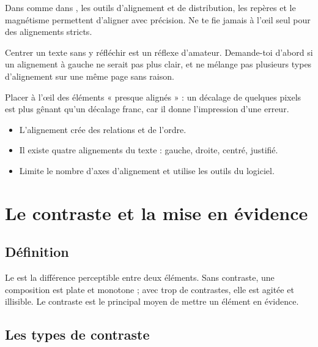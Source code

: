Dans  comme dans , les outils d'alignement et de distribution, les repères et le magnétisme permettent d'aligner avec précision. Ne te fie jamais à l'œil seul pour des alignements stricts.

\begin{astuce}
Centrer un texte sans y réfléchir est un réflexe d'amateur. Demande-toi d'abord si un alignement à gauche ne serait pas plus clair, et ne mélange pas plusieurs types d'alignement sur une même page sans raison.
\end{astuce}

\begin{erreur}
Placer à l'œil des éléments « presque alignés » : un décalage de quelques pixels est plus gênant qu'un décalage franc, car il donne l'impression d'une erreur.
\end{erreur}

\begin{retenir}
\begin{itemize}
  \item L'alignement crée des relations et de l'ordre.
  \item Il existe quatre alignements du texte : gauche, droite, centré, justifié.
  \item Limite le nombre d'axes d'alignement et utilise les outils du logiciel.
\end{itemize}
\end{retenir}

\section{Le contraste et la mise en évidence}

\subsection{Définition}

Le  est la différence perceptible entre deux éléments. Sans contraste, une composition est plate et monotone ; avec trop de contrastes, elle est agitée et illisible. Le contraste est le principal moyen de mettre un élément en évidence.

\subsection{Les types de contraste}

